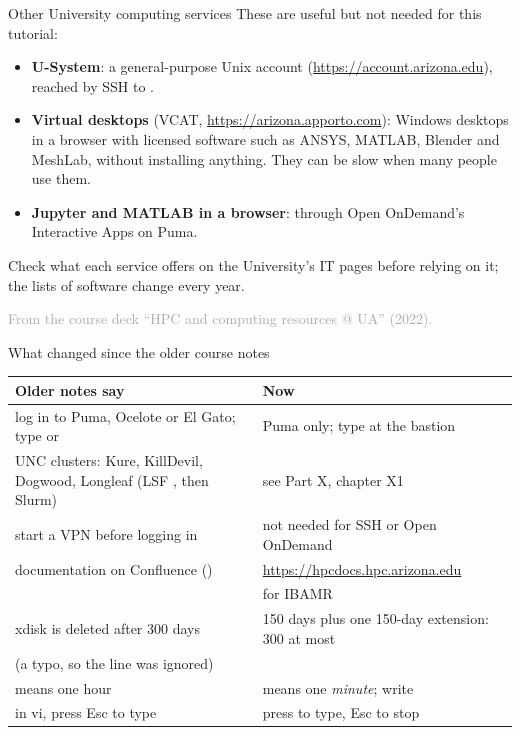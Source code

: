 \documentclass[aspectratio=169,11pt]{beamer}
\newcommand{\sourcecredit}[1]{\vfill\hfill{\tiny\textcolor{DarkGray}{#1}}}
\begin{document}
\begin{frame}{Other University computing services}
These are useful but not needed for this tutorial:
\begin{itemize}\small
  \item \textbf{U-System}: a general-purpose Unix account (\url{https://account.arizona.edu}), reached by SSH to .
  \item \textbf{Virtual desktops} (VCAT, \url{https://arizona.apporto.com}): Windows desktops in a browser with licensed software such as ANSYS, MATLAB, Blender and MeshLab, without installing anything. They can be slow when many people use them.
  \item \textbf{Jupyter and MATLAB in a browser}: through Open OnDemand's Interactive Apps on Puma.
\end{itemize}
\vspace{2mm}
\begin{punchbox}
\small Check what each service offers on the University's IT pages before relying on it; the lists of software change every year.
\end{punchbox}
\sourcecredit{From the course deck ``HPC and computing resources @ UA'' (2022).}
\end{frame}

\begin{frame}{What changed since the older course notes}
\small
\begin{tabular}{@{}L{0.42\textwidth}L{0.52\textwidth}@{}}
\toprule
Older notes say & Now \\
\midrule
log in to Puma, Ocelote or El Gato; type  or  & Puma only; type  at the bastion \\
UNC clusters: Kure, KillDevil, Dogwood, Longleaf (LSF , then Slurm) & see Part X, chapter X1 \\
start a VPN before logging in & not needed for SSH or Open OnDemand \\
documentation on Confluence () & \url{https://hpcdocs.hpc.arizona.edu} \\
 &  for IBAMR \\
xdisk is deleted after 300 days & 150 days plus one 150-day extension: 300 at most \\
 (a typo, so the line was ignored) &  \\
 means one hour &  means one \emph{minute}; write  \\
in vi, press Esc to type & press  to type, Esc to stop \\
\bottomrule
\end{tabular}
\end{frame}
\end{document}
